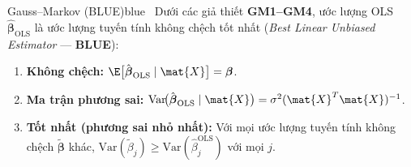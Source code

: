 \begin{mythm}{Gauss--Markov (BLUE)}{blue}~\cite{wooldridge2013}
Dưới các giả thiết \textbf{GM1–GM4}, ước lượng OLS $\hat{\boldsymbol{\beta}}_{\mathrm{OLS}}$
là ước lượng tuyến tính không chệch tốt nhất
(\textit{Best Linear Unbiased Estimator} --- \textbf{BLUE}):
\begin{enumerate}[label=(\roman*), noitemsep]
    \item \textbf{Không chệch:}
          $\E\bigl[\hat{\boldsymbol{\beta}}_{\mathrm{OLS}} \mid \mat{X}\bigr] = \boldsymbol{\beta}$.
    \item \textbf{Ma trận phương sai:}
          $\mathrm{Var}\!\bigl(\hat{\boldsymbol{\beta}}_{\mathrm{OLS}} \mid \mat{X}\bigr)
          = \sigma^2(\mat{X}^T\mat{X})^{-1}$.
    \item \textbf{Tốt nhất (phương sai nhỏ nhất):} Với mọi ước lượng tuyến tính
          không chệch $\tilde{\boldsymbol{\beta}}$ khác,
          $\mathrm{Var}(\tilde{\beta}_j) \geq \mathrm{Var}(\hat{\beta}_j^{\mathrm{OLS}})$
          với mọi $j$.
\end{enumerate}
\end{mythm}

